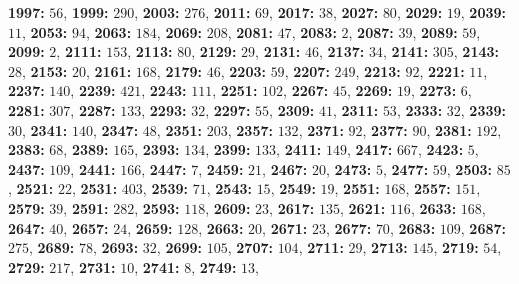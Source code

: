 \textsf{\bfseries 1997:} $56$, \textsf{\bfseries 1999:} $290$, \textsf{\bfseries 2003:} $276$, \textsf{\bfseries 2011:} $69$, \textsf{\bfseries 2017:} $38$, \textsf{\bfseries 2027:} $80$, \textsf{\bfseries 2029:} $19$, \textsf{\bfseries 2039:} $11$, \textsf{\bfseries 2053:} $94$, \textsf{\bfseries 2063:} $184$, \textsf{\bfseries 2069:} $208$, \textsf{\bfseries 2081:} $47$, \textsf{\bfseries 2083:} $2$, \textsf{\bfseries 2087:} $39$, \textsf{\bfseries 2089:} $59$, \textsf{\bfseries 2099:} $2$, \textsf{\bfseries 2111:} $153$, \textsf{\bfseries 2113:} $80$, \textsf{\bfseries 2129:} $29$, \textsf{\bfseries 2131:} $46$, \textsf{\bfseries 2137:} $34$, \textsf{\bfseries 2141:} $305$, \textsf{\bfseries 2143:} $28$, \textsf{\bfseries 2153:} $20$, \textsf{\bfseries 2161:} $168$, \textsf{\bfseries 2179:} $46$, \textsf{\bfseries 2203:} $59$, \textsf{\bfseries 2207:} $249$, \textsf{\bfseries 2213:} $92$, \textsf{\bfseries 2221:} $11$, \textsf{\bfseries 2237:} $140$, \textsf{\bfseries 2239:} $421$, \textsf{\bfseries 2243:} $111$, \textsf{\bfseries 2251:} $102$, \textsf{\bfseries 2267:} $45$, \textsf{\bfseries 2269:} $19$, \textsf{\bfseries 2273:} $6$, \textsf{\bfseries 2281:} $307$, \textsf{\bfseries 2287:} $133$, \textsf{\bfseries 2293:} $32$, \textsf{\bfseries 2297:} $55$, \textsf{\bfseries 2309:} $41$, \textsf{\bfseries 2311:} $53$, \textsf{\bfseries 2333:} $32$, \textsf{\bfseries 2339:} $30$, \textsf{\bfseries 2341:} $140$, \textsf{\bfseries 2347:} $48$, \textsf{\bfseries 2351:} $203$, \textsf{\bfseries 2357:} $132$, \textsf{\bfseries 2371:} $92$, \textsf{\bfseries 2377:} $90$, \textsf{\bfseries 2381:} $192$, \textsf{\bfseries 2383:} $68$, \textsf{\bfseries 2389:} $165$, \textsf{\bfseries 2393:} $134$, \textsf{\bfseries 2399:} $133$, \textsf{\bfseries 2411:} $149$, \textsf{\bfseries 2417:} $667$, \textsf{\bfseries 2423:} $5$, \textsf{\bfseries 2437:} $109$, \textsf{\bfseries 2441:} $166$, \textsf{\bfseries 2447:} $7$, \textsf{\bfseries 2459:} $21$, \textsf{\bfseries 2467:} $20$, \textsf{\bfseries 2473:} $5$, \textsf{\bfseries 2477:} $59$, \textsf{\bfseries 2503:} $85$, \textsf{\bfseries 2521:} $22$, \textsf{\bfseries 2531:} $403$, \textsf{\bfseries 2539:} $71$, \textsf{\bfseries 2543:} $15$, \textsf{\bfseries 2549:} $19$, \textsf{\bfseries 2551:} $168$, \textsf{\bfseries 2557:} $151$, \textsf{\bfseries 2579:} $39$, \textsf{\bfseries 2591:} $282$, \textsf{\bfseries 2593:} $118$, \textsf{\bfseries 2609:} $23$, \textsf{\bfseries 2617:} $135$, \textsf{\bfseries 2621:} $116$, \textsf{\bfseries 2633:} $168$, \textsf{\bfseries 2647:} $40$, \textsf{\bfseries 2657:} $24$, \textsf{\bfseries 2659:} $128$, \textsf{\bfseries 2663:} $20$, \textsf{\bfseries 2671:} $23$, \textsf{\bfseries 2677:} $70$, \textsf{\bfseries 2683:} $109$, \textsf{\bfseries 2687:} $275$, \textsf{\bfseries 2689:} $78$, \textsf{\bfseries 2693:} $32$, \textsf{\bfseries 2699:} $105$, \textsf{\bfseries 2707:} $104$, \textsf{\bfseries 2711:} $29$, \textsf{\bfseries 2713:} $145$, \textsf{\bfseries 2719:} $54$, \textsf{\bfseries 2729:} $217$, \textsf{\bfseries 2731:} $10$, \textsf{\bfseries 2741:} $8$, \textsf{\bfseries 2749:} $13$, 
